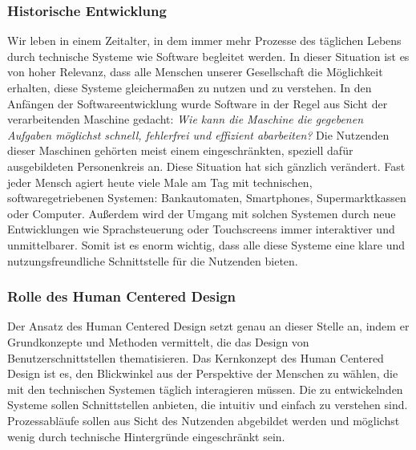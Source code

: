 \subsubsection{Historische Entwicklung}
Wir leben in einem Zeitalter, in dem immer mehr Prozesse des täglichen Lebens
durch technische Systeme wie Software begleitet werden. In dieser Situation ist
es von hoher Relevanz, dass alle Menschen unserer Gesellschaft die Möglichkeit
erhalten, diese Systeme gleichermaßen zu nutzen und zu verstehen. In den Anfängen
der Softwareentwicklung wurde Software in der Regel aus Sicht der
verarbeitenden Maschine gedacht: \textit{Wie kann die Maschine die gegebenen Aufgaben
möglichst schnell, fehlerfrei und effizient abarbeiten?} Die Nutzenden dieser
Maschinen gehörten meist einem eingeschränkten, speziell dafür ausgebildeten
Personenkreis an. Diese Situation hat sich gänzlich verändert. Fast jeder Mensch
agiert heute viele Male am Tag mit technischen, softwaregetriebenen Systemen:
Bankautomaten, Smartphones, Supermarktkassen oder Computer. Außerdem wird der
Umgang mit solchen Systemen durch neue Entwicklungen wie Sprachsteuerung oder
Touchscreens immer interaktiver und unmittelbarer. Somit ist es enorm wichtig,
dass alle diese Systeme eine klare und nutzungsfreundliche Schnittstelle für
die Nutzenden bieten\cite{moserTesting}.

\subsubsection{Rolle des Human Centered Design}
Der Ansatz des Human Centered Design setzt genau an dieser Stelle an, indem er
Grundkonzepte und Methoden vermittelt, die das Design von
Benutzerschnittstellen thematisieren\cite{hcd}. Das Kernkonzept des Human
Centered Design ist es, den Blickwinkel aus der Perspektive der Menschen zu
wählen, die mit den technischen Systemen täglich interagieren müssen. Die zu
entwickelnden Systeme sollen Schnittstellen anbieten, die intuitiv und einfach
zu verstehen sind. Prozessabläufe sollen aus Sicht des Nutzenden abgebildet
werden und möglichst wenig durch technische Hintergründe eingeschränkt
sein\cite{HMI-HCD}.

